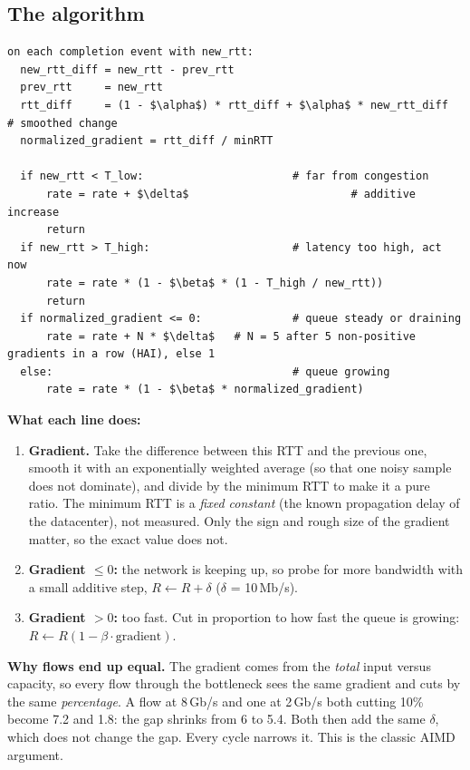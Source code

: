 \subsection{The algorithm}
\begin{lstlisting}[mathescape]
on each completion event with new_rtt:
  new_rtt_diff = new_rtt - prev_rtt
  prev_rtt     = new_rtt
  rtt_diff     = (1 - $\alpha$) * rtt_diff + $\alpha$ * new_rtt_diff     # smoothed change
  normalized_gradient = rtt_diff / minRTT

  if new_rtt < T_low:                       # far from congestion
      rate = rate + $\delta$                         # additive increase
      return
  if new_rtt > T_high:                      # latency too high, act now
      rate = rate * (1 - $\beta$ * (1 - T_high / new_rtt))
      return
  if normalized_gradient <= 0:              # queue steady or draining
      rate = rate + N * $\delta$   # N = 5 after 5 non-positive gradients in a row (HAI), else 1
  else:                                     # queue growing
      rate = rate * (1 - $\beta$ * normalized_gradient)
\end{lstlisting}


\textbf{What each line does:}
\begin{enumerate}
  \item \textbf{Gradient.} Take the difference between this RTT and the previous one, smooth it with an exponentially weighted average (so that
        one noisy sample does not dominate), and divide by the minimum RTT to make it a pure ratio. The minimum RTT is a \emph{fixed constant}
        (the known propagation delay of the datacenter), not measured. Only the sign and rough size of the gradient matter, so the exact value
        does not.
  \item \textbf{Gradient $\le 0$:} the network is keeping up, so probe for more bandwidth with a small additive step, $R \leftarrow R + \delta$
        ($\delta$ = 10\,Mb/s).
  \item \textbf{Gradient $> 0$:} too fast. Cut in proportion to how fast the queue is growing: $R \leftarrow R(1 - \beta \cdot \text{gradient})$.
\end{enumerate}

\textbf{Why flows end up equal.} The gradient comes from the \emph{total} input versus capacity, so every flow through the bottleneck sees the
same gradient and cuts by the same \emph{percentage}. A flow at 8\,Gb/s and one at 2\,Gb/s both cutting 10\% become 7.2 and 1.8: the gap shrinks
from 6 to 5.4. Both then add the same $\delta$, which does not change the gap. Every cycle narrows it. This is the classic AIMD argument.

